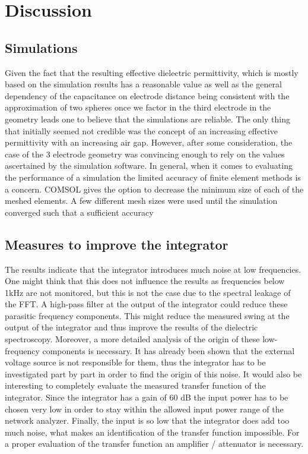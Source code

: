 \chapter{Discussion}

\section{Simulations}
Given the fact that the resulting effective dielectric permittivity, which
is mostly based on the simulation results has 
a reasonable value as well as the general dependency of the capacitance on electrode distance being consistent
with the approximation of two spheres once we factor in the third electrode in the geometry leads one 
to believe that the simulations are reliable. 
\newline
The only thing that initially seemed not credible was the concept of an increasing effective permittivity
with an increasing air gap. However, after some consideration, the case of the 3 electrode geometry was convincing enough to rely
on the values ascertained by the simulation software. 
\newline
In general, when it comes to evaluating the performance of a simulation the limited accuracy
of finite element methods is a concern. COMSOL gives the option to decrease the minimum size of each of the meshed elements.
A few different mesh sizes were used until the simulation converged such that a sufficient accuracy
\section{Measures to improve the integrator}
The results indicate that the integrator introduces much noise at low frequencies. One might think that this does not influence the results as frequencies below 1kHz are not monitored, but this is not the case due to the spectral leakage of the FFT.  A high-pass filter at the output of the integrator could reduce these parasitic frequency components. This might reduce the measured swing at the output of the integrator and thus improve the results of the dielectric spectroscopy. 
Moreover, a more detailed analysis of the origin of these low-frequency components is necessary. It has already been shown that the external voltage source is not responsible for them, thus the integrator has to be investigated part by part in order to find the origin of this noise. 
It would also be interesting to completely evaluate the measured transfer function of the integrator. Since the integrator has a gain of 60 dB the input power has to be chosen very low in order to stay within the allowed input power range of the network analyzer. Finally, the input is so low that the integrator does add too much noise, what makes an identification of the transfer function impossible. For a proper evaluation of the transfer function an amplifier / attenuator is necessary. 

